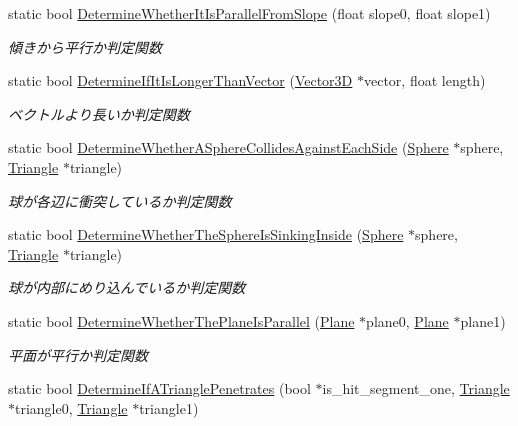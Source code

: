 \begin{DoxyCompactItemize}
static bool \mbox{\hyperlink{class_collision_calculation_a013889e5e69a001c229dcf083f884447}{Determine\+Whether\+It\+Is\+Parallel\+From\+Slope}} (float slope0, float slope1)
\begin{DoxyCompactList}\small\item\em 傾きから平行か判定関数 \end{DoxyCompactList}\item 
static bool \mbox{\hyperlink{class_collision_calculation_a37c172d64f5d30d772c9b9275215d83c}{Determine\+If\+It\+Is\+Longer\+Than\+Vector}} (\mbox{\hyperlink{class_vector3_d}{Vector3D}} $\ast$vector, float length)
\begin{DoxyCompactList}\small\item\em ベクトルより長いか判定関数 \end{DoxyCompactList}\item 
static bool \mbox{\hyperlink{class_collision_calculation_a05f88ea10634f6312ec556a202c2296d}{Determine\+Whether\+A\+Sphere\+Collides\+Against\+Each\+Side}} (\mbox{\hyperlink{class_sphere}{Sphere}} $\ast$sphere, \mbox{\hyperlink{class_triangle}{Triangle}} $\ast$triangle)
\begin{DoxyCompactList}\small\item\em 球が各辺に衝突しているか判定関数 \end{DoxyCompactList}\item 
static bool \mbox{\hyperlink{class_collision_calculation_a8878c4e262eb7027f4ae147a24c7ba33}{Determine\+Whether\+The\+Sphere\+Is\+Sinking\+Inside}} (\mbox{\hyperlink{class_sphere}{Sphere}} $\ast$sphere, \mbox{\hyperlink{class_triangle}{Triangle}} $\ast$triangle)
\begin{DoxyCompactList}\small\item\em 球が内部にめり込んでいるか判定関数 \end{DoxyCompactList}\item 
static bool \mbox{\hyperlink{class_collision_calculation_a53a77b483d1751ce918982c75eb2ac7c}{Determine\+Whether\+The\+Plane\+Is\+Parallel}} (\mbox{\hyperlink{class_plane}{Plane}} $\ast$plane0, \mbox{\hyperlink{class_plane}{Plane}} $\ast$plane1)
\begin{DoxyCompactList}\small\item\em 平面が平行か判定関数 \end{DoxyCompactList}\item 
static bool \mbox{\hyperlink{class_collision_calculation_abbb2a509b7c4e4bca5272e8e02ab7768}{Determine\+If\+A\+Triangle\+Penetrates}} (bool $\ast$is\+\_\+hit\+\_\+segment\+\_\+one, \mbox{\hyperlink{class_triangle}{Triangle}} $\ast$triangle0, \mbox{\hyperlink{class_triangle}{Triangle}} $\ast$triangle1)

\end{DoxyCompactItemize}
